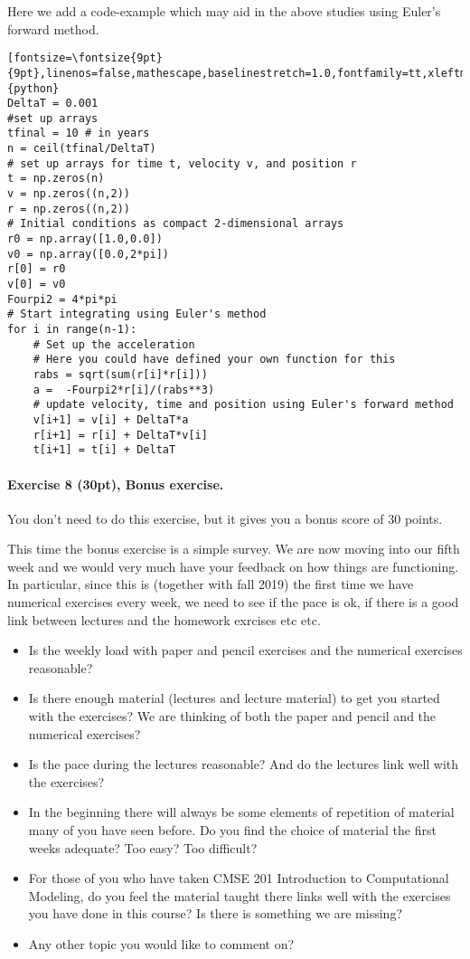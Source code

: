 \documentclass[%
oneside,                 %
final,                   %
10pt]{article}
\begin{document}
\noindent
Here we add a code-example which may aid in the above studies using Euler's forward method.
\begin{verbatim}[fontsize=\fontsize{9pt}{9pt},linenos=false,mathescape,baselinestretch=1.0,fontfamily=tt,xleftmargin=7mm]{python}
DeltaT = 0.001
#set up arrays 
tfinal = 10 # in years
n = ceil(tfinal/DeltaT)
# set up arrays for time t, velocity v, and position r
t = np.zeros(n)
v = np.zeros((n,2))
r = np.zeros((n,2))
# Initial conditions as compact 2-dimensional arrays
r0 = np.array([1.0,0.0])
v0 = np.array([0.0,2*pi])
r[0] = r0
v[0] = v0
Fourpi2 = 4*pi*pi
# Start integrating using Euler's method
for i in range(n-1):
    # Set up the acceleration
    # Here you could have defined your own function for this
    rabs = sqrt(sum(r[i]*r[i]))
    a =  -Fourpi2*r[i]/(rabs**3)
    # update velocity, time and position using Euler's forward method
    v[i+1] = v[i] + DeltaT*a
    r[i+1] = r[i] + DeltaT*v[i]
    t[i+1] = t[i] + DeltaT
\end{verbatim}


\paragraph{Exercise 8 (30pt), Bonus exercise.}
You don't need to do this exercise, but it gives you a bonus score of 30 points.

This time the bonus exercise is a simple survey. We are now moving
into our fifth week and we would very much have your feedback on how
things are functioning. In particular, since this is (together with fall
2019) the first time we have numerical exercises every week, we need
to see if the pace is ok, if there is a good link between lectures and
the homework exrcises etc etc.

\begin{itemize}
\item Is the weekly load with paper and pencil exercises and the numerical exercises reasonable?

\item Is there enough material (lectures and lecture material) to get you started with the exercises?  We are thinking of both the paper and pencil and the numerical exercises?

\item Is the pace during the lectures reasonable? And do the lectures link well with the exercises?

\item In the beginning there will always be some elements of repetition of material many of you have seen before. Do you find the choice of material the first weeks adequate? Too easy? Too difficult?

\item For those of you who have taken CMSE 201 Introduction to Computational Modeling, do you feel the material taught there links well with the exercises you have done in this course? Is there is something we are missing?

\item Any other topic you would like to comment on?
\end{itemize}

\noindent

\end{document}
